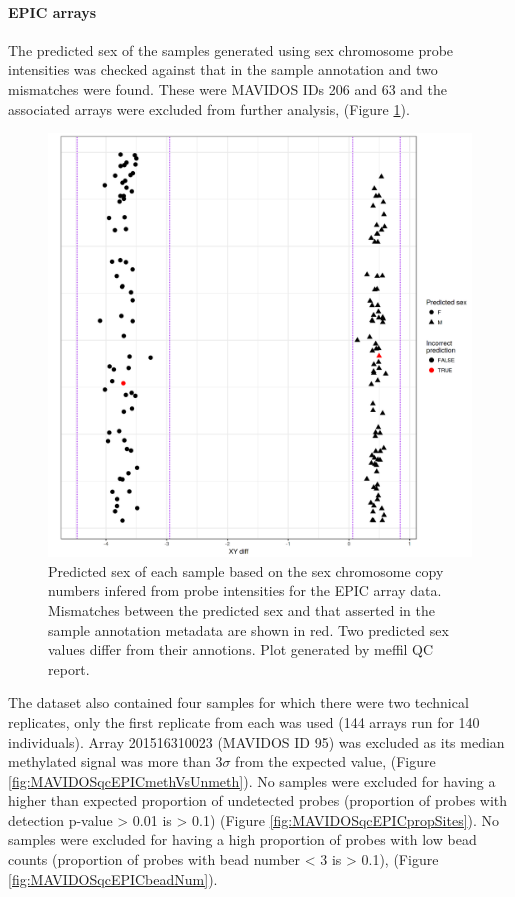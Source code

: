 \documentclass[
]{book}
\begin{document}
\hypertarget{epic-arrays}{%
\paragraph{EPIC arrays}\label{epic-arrays}}

The predicted sex of the samples generated using sex chromosome probe intensities was checked against that in the sample annotation and two mismatches were found.
These were MAVIDOS IDs 206 and 63 and the associated arrays were excluded from further analysis, (Figure \ref{fig:MAVIDOSqcEPICsexMismatch}).

\begin{figure}

{\centering \includegraphics[width=0.8\linewidth]{figs/MAVIDOSqcEPICsexMismatch} 

}

\caption{Predicted sex of each sample based on the sex chromosome copy numbers infered from probe intensities for the EPIC array data. Mismatches between the predicted sex and that asserted in the sample annotation metadata are shown in red. Two predicted sex values differ from their annotions. Plot generated by meffil QC report.}\label{fig:MAVIDOSqcEPICsexMismatch}
\end{figure}



The dataset also contained four samples for which there were two technical replicates, only the first replicate from each was used (144 arrays run for 140 individuals).
Array 201516310023 (MAVIDOS ID 95) was excluded as its median methylated signal was more than \(3\sigma\) from the expected value, (Figure \ref{fig:MAVIDOSqcEPICmethVsUnmeth}).
No samples were excluded for having a higher than expected proportion of undetected probes (proportion of probes with detection p-value \textgreater{} 0.01 is \textgreater{} 0.1) (Figure \ref{fig:MAVIDOSqcEPICpropSites}).
No samples were excluded for having a high proportion of probes with low bead counts (proportion of probes with bead number \textless{} 3 is \textgreater{} 0.1), (Figure \ref{fig:MAVIDOSqcEPICbeadNum}).
\end{document}

